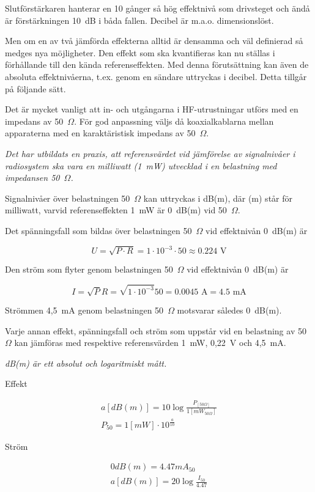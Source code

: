 Slutförstärkaren hanterar en 10 gånger så hög effektnivå som
drivsteget och ändå är förstärkningen 10~dB i båda fallen. Decibel är
m.a.o. dimensionslöst.

Men om en av två jämförda effekterna alltid är densamma och väl
definierad så medges nya möjligheter. Den effekt som ska
kvantifieras kan nu ställas i förhållande till den kända
referenseffekten. Med denna förutsättning kan även de absoluta
effektnivåerna, t.ex. genom en sändare uttryckas i decibel. Detta
tillgår på följande sätt.

Det är mycket vanligt att in- och utgångarna i HF-utrustningar utförs
med en impedans av 50~\(\Omega\). För god anpassning väljs då koaxialkablarna
mellan apparaterna med en karaktäristisk impedans av 50~\(\Omega\).

\emph{Det har utbildats en praxis, att referensvärdet vid jämförelse
  av signalnivåer i radiosystem ska vara en milliwatt (1~mW)
  utvecklad i en belastning med impedansen 50~\(\Omega\).}

Signalnivåer över belastningen 50~\(\Omega\) kan uttryckas i dB(m), där (m)
står för milliwatt, varvid referenseffekten 1~mW är 0~dB(m) vid 50~\(\Omega\).

Det spänningsfall som bildas över belastningen 50~\(\Omega\) vid effektnivån
0~dB(m) är

\[U = \sqrt{P\cdot R} = 1\cdot 10^{-3} \cdot 50 \approx 0.224 \text{ V}\]

Den ström som flyter genom belastningen 50~\(\Omega\) vid effektnivån 0~dB(m)
är

\[
I = \sqrt{P}{R} = \sqrt{1\cdot 10^{-3}}{50} = 0.0045 \text{ A} = 4.5 \text{ mA}
\]

Strömmen 4,5~mA genom belastningen 50~\(\Omega\) motsvarar således 0~dB(m).

Varje annan effekt, spänningsfall och ström som uppstår vid en
belastning av 50 \(\Omega\) kan jämföras med respektive referensvärden 1~mW,
0,22~V och 4,5~mA.

\emph{dB(m) är ett absolut och logaritmiskt mått.}

Effekt

\begin{gather*}
  a [dB(m)] = 10 \log\frac{P_{[50\Omega]}}{1[mW_{50\Omega}]} \\
  P_{50} = 1 [mW] \cdot 10^{\frac{a}{10}}
\end{gather*}

Ström

\begin{gather*}
  0 dB(m) = 4.47 mA_{50} \\
  a [dB(m)] = 20 \log\frac{I_{50}}{4.47}
\end{gather*}

